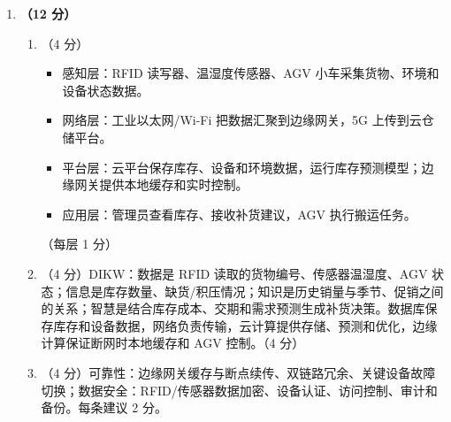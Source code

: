 \documentclass[a4paper,11pt]{article}
\begin{document}
\begin{enumerate}[start=29, label=\textbf{\arabic*.}, leftmargin=2.4em, itemsep=0.55em]
\item \textbf{（12 分）}
\begin{enumerate}[label=（\arabic*）, leftmargin=2.2em, itemsep=2pt]
  \item （4 分）
  \begin{itemize}[leftmargin=1.8em, itemsep=1pt]
    \item 感知层：RFID 读写器、温湿度传感器、AGV 小车采集货物、环境和设备状态数据。
    \item 网络层：工业以太网/Wi-Fi 把数据汇聚到边缘网关，5G 上传到云仓储平台。
    \item 平台层：云平台保存库存、设备和环境数据，运行库存预测模型；边缘网关提供本地缓存和实时控制。
    \item 应用层：管理员查看库存、接收补货建议，AGV 执行搬运任务。
  \end{itemize}
  \hfill（每层 1 分）
  \item （4 分）DIKW：数据是 RFID 读取的货物编号、传感器温湿度、AGV 状态；信息是库存数量、缺货/积压情况；知识是历史销量与季节、促销之间的关系；智慧是结合库存成本、交期和需求预测生成补货决策。数据库保存库存和设备数据，网络负责传输，云计算提供存储、预测和优化，边缘计算保证断网时本地缓存和 AGV 控制。\hfill（4 分）
  \item （4 分）可靠性：边缘网关缓存与断点续传、双链路冗余、关键设备故障切换；数据安全：RFID/传感器数据加密、设备认证、访问控制、审计和备份。每条建议 2 分。
\end{enumerate}

\end{enumerate}
\end{document}
